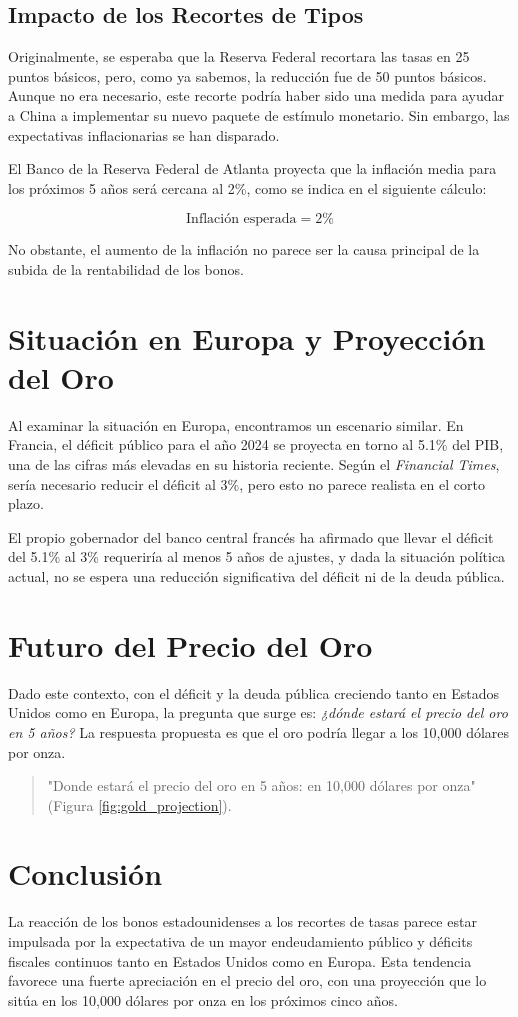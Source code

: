 \documentclass{article}
\begin{document}
\subsection{Impacto de los Recortes de Tipos}
Originalmente, se esperaba que la Reserva Federal recortara las tasas en 25 puntos básicos, pero, como ya sabemos, la reducción fue de 50 puntos básicos. Aunque no era necesario, este recorte podría haber sido una medida para ayudar a China a implementar su nuevo paquete de estímulo monetario. Sin embargo, las expectativas inflacionarias se han disparado.

El Banco de la Reserva Federal de Atlanta proyecta que la inflación media para los próximos 5 años será cercana al 2\%, como se indica en el siguiente cálculo:

\[
\text{Inflación esperada} = 2\%
\]

No obstante, el aumento de la inflación no parece ser la causa principal de la subida de la rentabilidad de los bonos.

\section{Situación en Europa y Proyección del Oro}
Al examinar la situación en Europa, encontramos un escenario similar. En Francia, el déficit público para el año 2024 se proyecta en torno al 5.1\% del PIB, una de las cifras más elevadas en su historia reciente. Según el \emph{Financial Times}, sería necesario reducir el déficit al 3\%, pero esto no parece realista en el corto plazo.

El propio gobernador del banco central francés ha afirmado que llevar el déficit del 5.1\% al 3\% requeriría al menos 5 años de ajustes, y dada la situación política actual, no se espera una reducción significativa del déficit ni de la deuda pública.

\section{Futuro del Precio del Oro}
Dado este contexto, con el déficit y la deuda pública creciendo tanto en Estados Unidos como en Europa, la pregunta que surge es: \emph{¿dónde estará el precio del oro en 5 años?} La respuesta propuesta es que el oro podría llegar a los 10,000 dólares por onza. 

\begin{quote}
"Donde estará el precio del oro en 5 años: en 10,000 dólares por onza" (Figura \ref{fig:gold_projection}).
\end{quote}

\section{Conclusión}
La reacción de los bonos estadounidenses a los recortes de tasas parece estar impulsada por la expectativa de un mayor endeudamiento público y déficits fiscales continuos tanto en Estados Unidos como en Europa. Esta tendencia favorece una fuerte apreciación en el precio del oro, con una proyección que lo sitúa en los 10,000 dólares por onza en los próximos cinco años.
\end{document}
